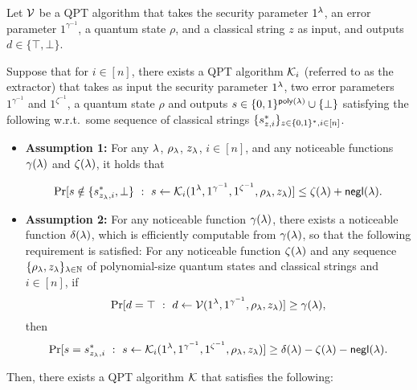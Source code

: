 \begin{lemma}
\label{lem:Simultaneous-SimExt}
Let $\mathcal{V}$ be a QPT algorithm that takes the security parameter $1^\lambda$, an error parameter $1^{\gamma^{-1}}$, 
a quantum state $\rho$, {and a classical string $z$}  
as input,  and outputs  $d\in \{\top,\bot\}$. %

Suppose that for $i\in [n]$, 
there exists a QPT algorithm $\mathcal{K}_i$ (referred to as the extractor) that takes as input the security parameter $1^\lambda$, two error parameters $1^{\gamma^{-1}}$ and $1^{\zeta^{-1}}$, 
a quantum state $\rho$ %
and outputs $s\in \{0,1\}^{\mathsf{poly}(\lambda)}\cup \{\bot\}$   
satisfying the following w.r.t.\ some sequence of classical strings {$\{s^*_{z,i}\}_{z\in \{0,1\}^*,i\in[n]}$.}  
\begin{itemize}
 \item    \label{item:simultaneous_s_star_or_bot} 
    {\bf Assumption 1:} For any $\lambda$,  $\rho_\lambda$,  $z_\lambda$, $i\in [n]$, and any noticeable functions $\gamma(\lambda)$ and $\zeta(\lambda)$, it holds that  

$$\Pr[s \notin \{s^*_{z_\lambda,i}, \bot\}~:~s \leftarrow \mathcal{K}_i(1^\lambda,1^{\gamma^{-1}}, 1^{\zeta^{-1}}, \rho_\lambda,{z_\lambda})]\le \zeta(\lambda) +\mathsf{negl}(\lambda).$$


    \item \label{item:simultaneous_gamma_delta}
    {\bf Assumption 2:} For any noticeable function $\gamma(\lambda)$, there exists a noticeable function  $\delta(\lambda)$, 
 which is efficiently computable from $\gamma(\lambda)$, so that the following requirement is satisfied: 
 For any noticeable function $\zeta(\lambda)$
 and any sequence $\{\rho_\lambda,{z_\lambda}\}_{\lambda\in\mathbb{N}}$ of polynomial-size quantum states and classical strings and $i\in[n]$, %
 if 
$$
\Pr[d=\top ~:~ d \leftarrow \mathcal{V}(1^\lambda,1^{\gamma^{-1}},\rho_\lambda,{z_\lambda})]\geq  \gamma(\lambda), 
$$  
then 
$$
\Pr[s =s^*_{{z_\lambda,i}}~:~ s\leftarrow \mathcal{K}_i(1^\lambda,1^{\gamma^{-1}}, 1^{\zeta^{-1}}, \rho_\lambda,{z_\lambda})]\geq   \delta(\lambda)-\zeta(\lambda)-\mathsf{negl}(\lambda).
$$
\end{itemize}
Then, there exists a QPT algorithm $\mathcal{K}$ that satisfies the following:  
\end{lemma}
